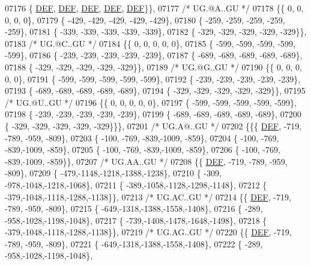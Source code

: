 \begin{DoxyCode}
07176 \{  \mbox{\hyperlink{1_88_84__epars_8h_a397419fc12b37ed479c8abb9d444d843}{DEF}},  \mbox{\hyperlink{1_88_84__epars_8h_a397419fc12b37ed479c8abb9d444d843}{DEF}},  \mbox{\hyperlink{1_88_84__epars_8h_a397419fc12b37ed479c8abb9d444d843}{DEF}},  \mbox{\hyperlink{1_88_84__epars_8h_a397419fc12b37ed479c8abb9d444d843}{DEF}},  \mbox{\hyperlink{1_88_84__epars_8h_a397419fc12b37ed479c8abb9d444d843}{DEF}}\}\},
07177 \textcolor{comment}{/* UG.@A..GU */}
07178 \{\{    0,    0,    0,    0,    0\},
07179 \{ -429, -429, -429, -429, -429\},
07180 \{ -259, -259, -259, -259, -259\},
07181 \{ -339, -339, -339, -339, -339\},
07182 \{ -329, -329, -329, -329, -329\}\},
07183 \textcolor{comment}{/* UG.@C..GU */}
07184 \{\{    0,    0,    0,    0,    0\},
07185 \{ -599, -599, -599, -599, -599\},
07186 \{ -239, -239, -239, -239, -239\},
07187 \{ -689, -689, -689, -689, -689\},
07188 \{ -329, -329, -329, -329, -329\}\},
07189 \textcolor{comment}{/* UG.@G..GU */}
07190 \{\{    0,    0,    0,    0,    0\},
07191 \{ -599, -599, -599, -599, -599\},
07192 \{ -239, -239, -239, -239, -239\},
07193 \{ -689, -689, -689, -689, -689\},
07194 \{ -329, -329, -329, -329, -329\}\},
07195 \textcolor{comment}{/* UG.@U..GU */}
07196 \{\{    0,    0,    0,    0,    0\},
07197 \{ -599, -599, -599, -599, -599\},
07198 \{ -239, -239, -239, -239, -239\},
07199 \{ -689, -689, -689, -689, -689\},
07200 \{ -329, -329, -329, -329, -329\}\}\},
07201 \textcolor{comment}{/* UG.A@..GU */}
07202 \{\{\{  \mbox{\hyperlink{1_88_84__epars_8h_a397419fc12b37ed479c8abb9d444d843}{DEF}}, -719, -789, -959, -809\},
07203 \{ -100, -769, -839,-1009, -859\},
07204 \{ -100, -769, -839,-1009, -859\},
07205 \{ -100, -769, -839,-1009, -859\},
07206 \{ -100, -769, -839,-1009, -859\}\},
07207 \textcolor{comment}{/* UG.AA..GU */}
07208 \{\{  \mbox{\hyperlink{1_88_84__epars_8h_a397419fc12b37ed479c8abb9d444d843}{DEF}}, -719, -789, -959, -809\},
07209 \{ -479,-1148,-1218,-1388,-1238\},
07210 \{ -309, -978,-1048,-1218,-1068\},
07211 \{ -389,-1058,-1128,-1298,-1148\},
07212 \{ -379,-1048,-1118,-1288,-1138\}\},
07213 \textcolor{comment}{/* UG.AC..GU */}
07214 \{\{  \mbox{\hyperlink{1_88_84__epars_8h_a397419fc12b37ed479c8abb9d444d843}{DEF}}, -719, -789, -959, -809\},
07215 \{ -649,-1318,-1388,-1558,-1408\},
07216 \{ -289, -958,-1028,-1198,-1048\},
07217 \{ -739,-1408,-1478,-1648,-1498\},
07218 \{ -379,-1048,-1118,-1288,-1138\}\},
07219 \textcolor{comment}{/* UG.AG..GU */}
07220 \{\{  \mbox{\hyperlink{1_88_84__epars_8h_a397419fc12b37ed479c8abb9d444d843}{DEF}}, -719, -789, -959, -809\},
07221 \{ -649,-1318,-1388,-1558,-1408\},
07222 \{ -289, -958,-1028,-1198,-1048\},

\end{DoxyCode}
